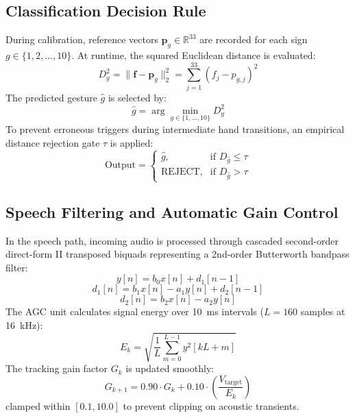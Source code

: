 \documentclass[conference]{IEEEtran}
\begin{document}
\subsection{Classification Decision Rule}
During calibration, reference vectors $\mathbf{p}_g \in \mathbb{R}^{33}$ are recorded for each sign $g \in \{1, 2, \dots, 10\}$. At runtime, the squared Euclidean distance is evaluated:
\begin{equation}
D_g^2 = \|\mathbf{f} - \mathbf{p}_g\|_2^2 = \sum_{j=1}^{33} (f_j - p_{g,j})^2
\label{eq:dist}
\end{equation}
The predicted gesture $\hat{g}$ is selected by:
\begin{equation}
\hat{g} = \arg\min_{g \in \{1,\dots,10\}} D_g^2
\label{eq:argmin}
\end{equation}
To prevent erroneous triggers during intermediate hand transitions, an empirical distance rejection gate $\tau$ is applied:
\begin{equation}
\text{Output} = \begin{cases} \hat{g}, & \text{if } D_{\hat{g}} \le \tau \\ \text{REJECT}, & \text{if } D_{\hat{g}} > \tau \end{cases}
\label{eq:rejection}
\end{equation}

\subsection{Speech Filtering and Automatic Gain Control}
In the speech path, incoming audio is processed through cascaded second-order direct-form II transposed biquads representing a 2nd-order Butterworth bandpass filter:
\begin{equation}
y[n] = b_0 x[n] + d_1[n-1]
\label{eq:biquad1}
\end{equation}
\begin{equation}
d_1[n] = b_1 x[n] - a_1 y[n] + d_2[n-1]
\label{eq:biquad2}
\end{equation}
\begin{equation}
d_2[n] = b_2 x[n] - a_2 y[n]
\label{eq:biquad3}
\end{equation}
The AGC unit calculates signal energy over 10~ms intervals ($L = 160$ samples at 16~kHz):
\begin{equation}
E_k = \sqrt{\frac{1}{L}\sum_{m=0}^{L-1} y^2[kL + m]}
\label{eq:energy}
\end{equation}
The tracking gain factor $G_k$ is updated smoothly:
\begin{equation}
G_{k+1} = 0.90 \cdot G_k + 0.10 \cdot \left(\frac{V_{\text{target}}}{E_k}\right)
\label{eq:gain_smooth}
\end{equation}
clamped within $[0.1, 10.0]$ to prevent clipping on acoustic transients.
\end{document}
